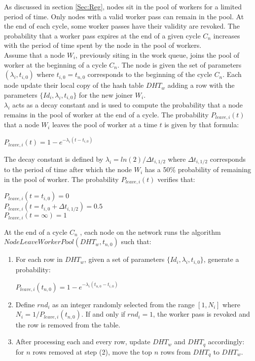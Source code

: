 As discussed in section \ref{Sec:Reg}, nodes sit in the pool of workers for a limited period of time. Only nodes with a valid worker pass can remain in the pool. At the end of each cycle, some worker passes have their validity are revoked. The probability that a worker pass expires at the end of a given cycle $C_n$ increases with the period of time spent by the node in the pool of workers. \\

Assume that a node $W_i$, previously siting in the work queue, joins the pool of worker at the beginning of a cycle $C_n$. The node is given the set of parameters $(\lambda_i, t_{i,0})$ where $t_{i,0}=t_{n,0}$ corresponds to the beginning of the cycle $C_n$. Each node update their local copy of the hash table $DHT_w$ adding a row with the parameters $\{Id_i, \lambda_i, t_{i,0}\}$ for the new joiner $W_i$.\\

$\lambda_i$ acts as a decay constant and is used to compute the probability that a node remains in the pool of worker at the end of a cycle. The probability $P_{leave,i}(t)$ that a node $W_i$ leaves the pool of worker at a time $t$ is given by that formula:
\begin{center}
$P_{leave,i}(t) = 1 - e^{-\lambda_i(t-t_{i,0})}$
\end{center}
The decay constant is defined by  $\lambda_i = ln(2)/\Delta t_{i,1/2}$ where $\Delta t_{i,1/2}$ corresponds to the period of time after which the node $W_i$ has a 50\% probability of  remaining in the pool of worker. The probability $P_{leave,i}(t)$ verifies that:
\begin{flushleft}
$P_{leave,i}(t = t_{i,0}) = 0$\\
$P_{leave,i}(t = t_{i,0} + \Delta t_{i,1/2}) = 0.5$\\
$P_{leave,i}(t = \infty) = 1$
\end{flushleft}
 
At the end of a cycle $C_n$ , each node on the network runs the algorithm\\ $NodeLeaveWorkerPool(DHT_w,t_{n,0})$ such that:
\begin{enumerate}
\item For each row in $DHT_w$, given a set of parameters $\{Id_i, \lambda_i, t_{i,0}\}$, generate a probability:
\begin{center}
$P_{leave,i}(t_{n,0}) = 1 - e^{-\lambda_i(t_{n,0}-t_{i,0})}$
\end{center}
\item Define $rnd_i$ as an integer randomly selected from the range $[1, N_i]$ where $N_i = 1/P_{leave,i}(t_{n,0})$. If and only if $rnd_i = 1$, the worker pass is revoked and the row is removed from the table.
\item After processing each and every row, update $DHT_w$ and $DHT_q$ accordingly: for $n$ rows removed at step (2), move the top $n$ rows from $DHT_q$ to $DHT_w$. 
\end{enumerate}
